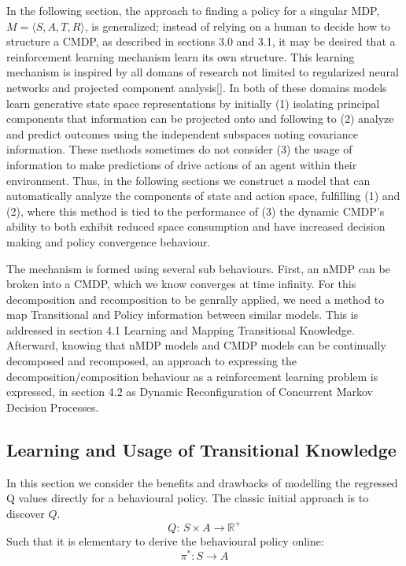 \documentclass[compsoc,journal,letterpaper,10pt,draftcls,twocolumn]{IEEEtran}
\begin{document}
In the following section, the approach to finding a policy for a
singular MDP, $M = \langle S, A, T, R \rangle$, is generalized; instead of relying on
a human to decide how to structure a CMDP, as described in sections 3.0
and 3.1, it may be desired that a reinforcement learning mechanism learn
its own structure. This learning mechanism is inspired by all domans of
research not limited to regularized neural networks and projected
component analysis{[}{]}. In both of these domains models learn
generative state space representations by initially (1) isolating
principal components that information can be projected onto and
following to (2) analyze and predict outcomes using the independent
subspaces noting covariance information. These methods sometimes do not
consider (3) the usage of information to make predictions of drive
actions of an agent within their environment. Thus, in the following
sections we construct a model that can automatically analyze the
components of state and action space, fulfilling (1) and (2), where this
method is tied to the performance of (3) the dynamic CMDP's ability to
both exhibit reduced space consumption and have increased decision
making and policy convergence behaviour.

The mechanism is formed using several sub behaviours. First, an nMDP can
be broken into a CMDP, which we know converges at time infinity. For
this decomposition and recomposition to be genrally applied, we need a
method to map Transitional and Policy information between similar
models. This is addressed in section 4.1 Learning and Mapping
Transitional Knowledge. Afterward, knowing that nMDP models and CMDP
models can be continually decomposed and recomposed, an approach to
expressing the decomposition/composition behaviour as a reinforcement
learning problem is expressed, in section 4.2 as Dynamic Reconfiguration
of Concurrent Markov Decision Processes.

\subsection{Learning and Usage of Transitional
Knowledge}\label{learning-and-usage-of-transitional-knowledge}

In this section we consider the benefits and drawbacks of modelling the
regressed Q values directly for a behavioural policy. The classic
initial approach is to discover $Q$.
\begin{equation}
Q:\,S \times A \rightarrow \mathbb{R}^{+}
\end{equation}
Such that it is elementary to derive the behavioural policy online:
\begin{equation}
\pi^{*}:S \rightarrow A
\end{equation}
\end{document}
